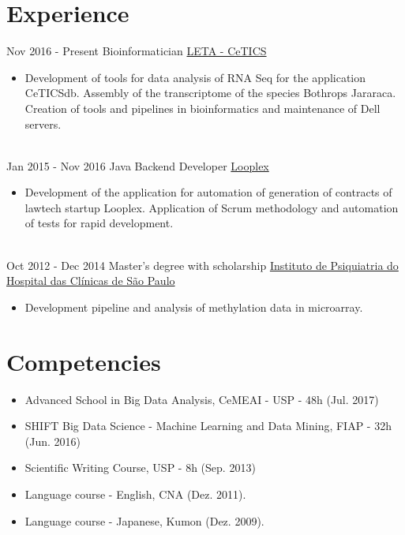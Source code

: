 \documentclass[letterpaper]{twentysecondcv} %
\begin{document}

\section{Experience}

\begin{twenty} %
\twentyitem
    	{Nov 2016 - }
		{Present}
        {Bioinformatician}
        {\href{http://cetics.butantan.gov.br/}{LETA - CeTICS}}
        {}
        {\begin{itemize}
        \item Development of tools for data analysis of RNA Seq for the application CeTICSdb. Assembly of the transcriptome of the species Bothrops Jararaca. Creation of tools and pipelines in bioinformatics and maintenance of Dell servers.
        \end{itemize}}
        \\
	\twentyitem
    	{Jan 2015 - }
		{Nov 2016}
        {Java Backend Developer }
        {\href{www.looplex.com.br/}{Looplex}}
        {}
        {
        {\begin{itemize}
        \item Development of the application for automation of generation of contracts of lawtech startup Looplex. Application of Scrum methodology and automation of tests for rapid development.
    \end{itemize}}
        }
    \\   
    \twentyitem
   		{Oct 2012 - }
		{Dec 2014}
        {Master's degree with scholarship}
        {\href{www.ipqhc.org.br}{Instituto de Psiquiatria do Hospital das Clínicas de São Paulo}}
        {}
        {
        {\begin{itemize}
        \item Development pipeline and analysis of methylation data in microarray.
    \end{itemize}}
        }       
\end{twenty}

\section{Competencies}
\begin{itemize}
	\item Advanced School in Big Data Analysis, CeMEAI - USP - 48h (Jul. 2017)
	\item SHIFT Big Data Science - Machine Learning and Data Mining, FIAP - 32h (Jun. 2016)
	\item Scientific Writing Course, USP - 8h (Sep. 2013)
	\item Language course - English, CNA (Dez. 2011).
	\item Language course - Japanese, Kumon (Dez. 2009).
\end{itemize}
\end{document}
